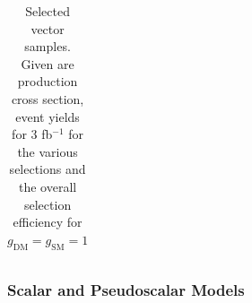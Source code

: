 \begin{table}[h!]
\begin{tabular}{lllllll}
\hline
\end{tabular}
\caption{Selected vector samples. Given are production cross section, event yields for 3 fb$^{-1 }$ for the various selections and the overall selection efficiency for $g_\textrm{DM}=g_\textrm{SM}=1$}
\label{tab:dm_V_g1_3fb}
\end{table}




\clearpage
\subsubsection{Scalar and Pseudoscalar Models} \label{sec:dm_pscalar}

